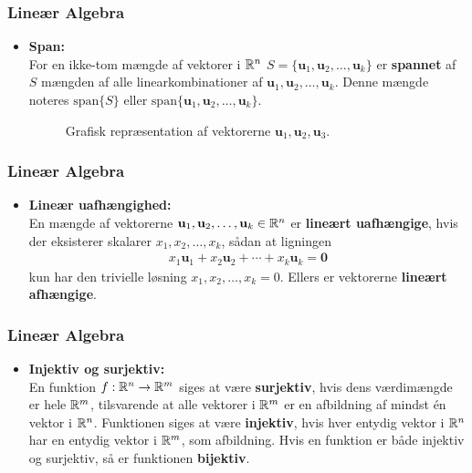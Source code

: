 \begin{frame}
\frametitle{Lineær Algebra}
\begin{itemize}
\item \textbf{Span: } \\ 
For en ikke-tom mængde af vektorer i $\mathbb{R}^n$ $S = \{\mathbf{u}_1, \mathbf{u}_2 , \ldots , \mathbf{u}_k \}$ er \textbf{spannet} af $S$ mængden af alle linearkombinationer af $\mathbf{u}_1, \mathbf{u}_2 , \ldots , \mathbf{u}_k$. 
Denne mængde noteres $\text{span} \{ S \}$ eller $\text{span}\{ \mathbf{u}_1, \mathbf{u}_2 , \ldots , \mathbf{u}_k \}$.
\begin{figure}[h!]
%
%
\caption{Grafisk repræsentation af vektorerne $\mathbf{u}_1, \mathbf{u}_2,  \mathbf{u}_3$.}
\label{span_eks}
\end{figure}
\end{itemize}
\end{frame}
\begin{frame}
\frametitle{Lineær Algebra}
\begin{itemize}
\item \textbf{Lineær uafhængighed: } \\ 
En mængde af vektorerne $\mathbf{u}_1, \mathbf{u}_2, \ldots , \mathbf{u}_k \in \mathbb{R}^n$ er \textbf{lineært uafhængige}, hvis der eksisterer skalarer $x_1, x_2, \ldots , x_k$, sådan at ligningen 
\begin{align*}
x_1\mathbf{u}_1 + x_2\mathbf{u}_2 + \cdots + x_k \mathbf{u}_k = \mathbf{0}
\end{align*}
kun har den trivielle løsning $x_1, x_2, \ldots, x_k = 0$.
Ellers er vektorerne \textbf{lineært afhængige}.
\end{itemize}
\end{frame}
\begin{frame}
\frametitle{Lineær Algebra}
\begin{itemize}
\item \textbf{Injektiv og surjektiv: } \\ 
En funktion $f:\mathbb{R}^n \rightarrow \mathbb{R}^m$ siges at være \textbf{surjektiv}, hvis dens værdimængde er hele $\mathbb{R}^m$, tilsvarende at alle vektorer i $\mathbb{R}^m$ er en afbildning af mindst én vektor i $\mathbb{R}^n$.
Funktionen siges at være \textbf{injektiv}, hvis hver entydig vektor i $\mathbb{R}^n$ har en entydig vektor i $\mathbb{R}^m$, som afbildning.
Hvis en funktion er både injektiv og surjektiv, så er funktionen \textbf{bijektiv}.
\end{itemize}
\end{frame}
